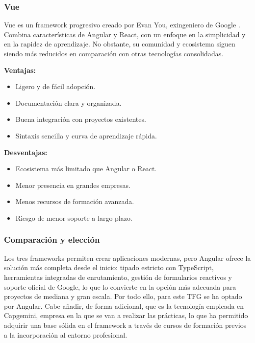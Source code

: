 \subsubsection{Vue}
Vue es un framework progresivo creado por Evan You, exingeniero de Google \cite{vueDocs}. Combina características de Angular y React, con un enfoque en la simplicidad y en la rapidez de aprendizaje. No obstante, su comunidad y ecosistema siguen siendo más reducidos en comparación con otras tecnologías consolidadas.

\textbf{Ventajas:}
\begin{itemize}
    \item Ligero y de fácil adopción.
    \item Documentación clara y organizada.
    \item Buena integración con proyectos existentes.
    \item Sintaxis sencilla y curva de aprendizaje rápida.
\end{itemize}

\textbf{Desventajas:}
\begin{itemize}
    \item Ecosistema más limitado que Angular o React.
    \item Menor presencia en grandes empresas.
    \item Menos recursos de formación avanzada.
    \item Riesgo de menor soporte a largo plazo.
\end{itemize}

\subsubsection{Comparación y elección}
Los tres frameworks permiten crear aplicaciones modernas, pero Angular ofrece la solución más completa desde el inicio: tipado estricto con TypeScript, herramientas integradas de enrutamiento, gestión de formularios reactivos y soporte oficial de Google, lo que lo convierte en la opción más adecuada para proyectos de mediana y gran escala. Por todo ello, para este TFG se ha optado por Angular. Cabe añadir, de forma adicional, que es la tecnología empleada en Capgemini, empresa en la que se van a realizar las prácticas, lo que ha permitido adquirir una base sólida en el framework a través de cursos de formación previos a la incorporación al entorno profesional.

